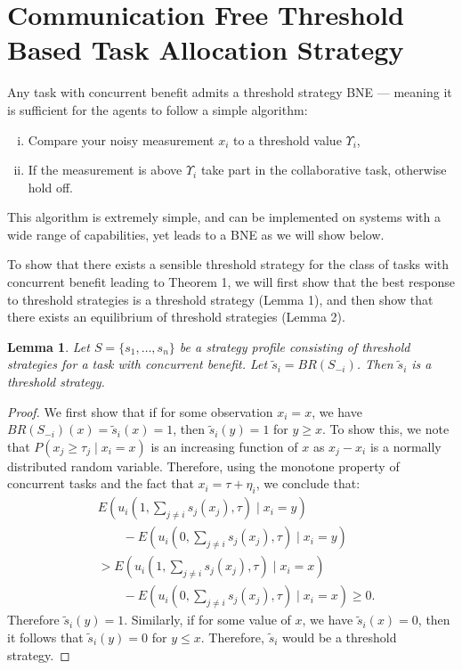 \documentclass[12pt]{book}
\newtheorem{lemma}{Lemma}
\newcommand{\td}{\Upsilon}   %
\begin{document}
\section{Communication Free Threshold\\Based Task Allocation Strategy}\label{sec:discretethreshold}
Any task with concurrent benefit admits a threshold strategy BNE --- meaning it is sufficient for the agents to follow a simple algorithm: 
\begin{enumerate}[(i)]
\item Compare your noisy measurement $x_i$ to a threshold value $\td_i$,
\item If the measurement is above $\td_i$ take part in the collaborative task, otherwise hold off.
\end{enumerate}
This algorithm is extremely simple, and can be implemented on systems with a wide range of capabilities, yet leads to a BNE as we will show below.

To show that there exists a sensible threshold strategy for the class of tasks with concurrent benefit leading to Theorem 1, we will first show that the best response to threshold strategies is a threshold strategy (Lemma 1), and then show that there exists an equilibrium of threshold strategies \cite{Carlsson1993,Morris2000} (Lemma 2).

\setcounter{lemma}{0}

\begin{lemma}
Let $S=\{s_1,\ldots,s_n\}$ be a strategy profile consisting of threshold strategies for a task with  concurrent benefit. Let $\tilde{s}_i=BR(S_{-i})$. Then $\tilde{s}_i$ is a threshold strategy. 
\end{lemma} 

\begin{proof}
We first show that if for some observation $x_i=x$, we have $BR(S_{-i})(x)=\tilde{s}_i(x)=1$, then $\tilde{s}_i(y)=1$ for $y\geq x$. To show this,  we note that $P(x_j\geq \tau_j\mid x_i=x)$ is an increasing function of $x$ as $x_j-x_i$ is a normally distributed random variable. Therefore, using the monotone property of concurrent tasks and the fact that $x_i=\tau+\eta_i$, we conclude that:
\vspace{-5px}
\begin{align}
&E(u_i(1,\sum_{j\not=i}s_j(x_j),\tau)\mid x_i=y)\\ 
&\qquad-E(u_i(0,\sum_{j\not=i}s_j(x_j),\tau)\mid x_i=y)\\ 
&>E(u_i(1,\sum_{j\not=i}s_j(x_j),\tau)\mid x_i=x)\\
&\qquad-E(u_i(0,\sum_{j\not=i}s_j(x_j),\tau)\mid x_i=x)\geq 0.
\end{align}
Therefore $\tilde{s}_i(y)=1$. Similarly, if for some value of $x$, we have $\tilde{s}_i(x)=0$, then it follows that $\tilde{s}_i(y)=0$ for $y\leq x$. Therefore, $\tilde{s}_i$ would be a threshold strategy.  
\end{proof}
\end{document}
